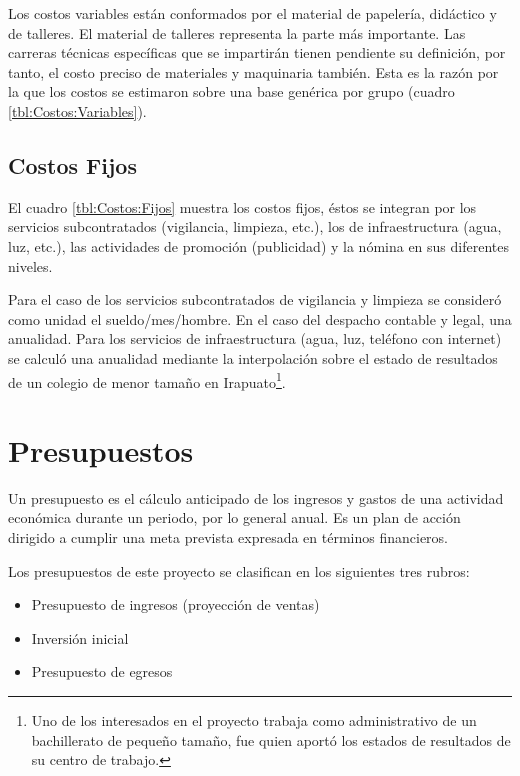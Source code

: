 Los costos variables están conformados por el material de papelería, didáctico y de talleres. El material de talleres representa la parte más importante. Las carreras técnicas específicas que se impartirán tienen pendiente su definición, por tanto, el costo preciso de materiales y maquinaria también. Esta es la razón por la que los costos se estimaron sobre una base genérica por grupo (cuadro \ref{tbl:Costos:Variables}).



\subsection{Costos Fijos}

El cuadro \ref{tbl:Costos:Fijos} muestra los costos fijos, éstos se integran por los servicios subcontratados (vigilancia, limpieza, etc.), los de infraestructura (agua, luz, etc.), las actividades de promoción (publicidad) y la nómina en sus diferentes niveles.

Para el caso de los servicios subcontratados de vigilancia y limpieza se consideró como unidad el sueldo/mes/hombre. En el caso del despacho contable y legal, una anualidad. Para los servicios de infraestructura (agua, luz, teléfono con internet) se calculó una anualidad mediante la interpolación sobre el estado de resultados de un colegio de menor tamaño en Irapuato\footnote{Uno de los interesados en el proyecto trabaja como administrativo de un bachillerato de pequeño tamaño, fue quien aportó los estados de resultados de su centro de trabajo.}.







\clearpage
\section{Presupuestos}

Un presupuesto es el cálculo anticipado de los ingresos y gastos de una actividad económica durante un periodo, por lo general anual. Es un plan de acción dirigido a cumplir una meta prevista expresada en términos financieros.

Los presupuestos de este proyecto se clasifican en los siguientes tres rubros:

\begin{itemize}
	\item Presupuesto de ingresos (proyección de ventas)
	\item Inversión inicial
	\item Presupuesto de egresos
\end{itemize}

